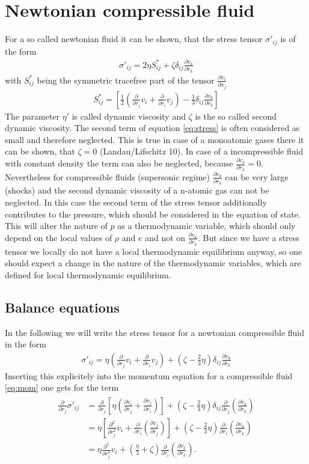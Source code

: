 \documentclass[a4paper,
					12pt,
					twoside,
					openright
					]{book}
\newcommand{\lra}[1]{{ \left( #1 \right) }}
\newcommand{\lrb}[1]{{ \left[ #1 \right] }}
\newcommand{\pd}[1]{\frac{\partial}{\partial #1}}
\newcommand{\ppd}[2]{\frac{\partial #2}{\partial #1}}
\newcommand{\pdd}[1]{\frac{\partial^2}{\partial #1^2}}
\begin{document}
\chapter{Newtonian compressible fluid}
For a so called newtonian fluid it can be shown, that the stress tensor
$\sigma'_{ij}$ is of the form
\begin{align}
\sigma'_{ij}=2\eta S^*_{ij}+\zeta \delta_{ij}\ppd{r_k}{v_k}
\label{eq:stress}
\end{align}
with $S^*_{ij}$ being the symmetric tracefree part of the tensor
$\ppd{x_j}{v_i}$
\begin{align}
S^*_{ij}=\lrb{\frac{1}{2}\lra{\pd{r_j}v_i+\pd{r_i}v_j}-\frac{1}{3}\delta_{ij}
\ppd{r_k}{v_k}}
\end{align}
The parameter $\eta'$ is called dynamic viscosity and $\zeta$ is the so called
second dynamic viscosity. The second term of equation \eqref{eq:stress} is
often considered as small and therefore neglected. This is true in case of a
monoatomic gases there it can be shown, that $\zeta=0$ (Landau/Lifschitz 10).
In case of a incompressible fluid with constant density the term can also be
neglected, because $\ppd{r_k}{v_k} = 0$. Nevertheless for compressible fluids
(supersonic regime) $\ppd{r_k}{v_k}$ can be very large (shocks) and the second
dynamic viscosity of a n-atomic gas can not be neglected. In this case the
second term of the stress tensor additionally contributes to the pressure,
which should be considered in the equation of state. This will alter the nature
of $p$ as a thermodynamic variable, which should only depend on the local values
of $\rho$ and $e$ and not on $\ppd{r_k}{v_k}$. But since we have a stress tensor
we locally do not have a local thermodynamic equilibrium anyway, so one should
expect a change in the nature of the thermodynamic variables, which are
defined for local thermodynamic equilibrium.

\section{Balance equations}
In the following we will write the stress tensor for a newtonian compressible 
fluid in the form
\begin{align}
\sigma'_{ij}= \eta\lra{\pd{r_j}v_i+\pd{r_i}v_j} 
+ \lra{\zeta-\frac{2}{3}\eta}\delta_{ij}\ppd{r_k}{v_k} 
\label{eq:stress2}
\end{align}
Inserting this explicitely into the momentum equation for a compressible fluid
\eqref{eq:mom} one gets for the term
\begin{align}
\begin{split}
\pd{r_j} \sigma'_{ij} &= 
\pd{r_j}\lrb{\eta \lra{\ppd{r_j}{v_i}+\ppd{r_i}{v_j}}}
+\lra{\zeta-\frac{2}{3}\eta}\delta_{ij}\pd{r_j}\lra{\ppd{r_k}{v_k}}\\
&= \eta \lrb{\pdd{r_j}v_i +\pd{r_i}\lra{\ppd{r_j}{v_j}}}
+\lra{\zeta-\frac{2}{3}\eta}\pd{r_i}\lra{\ppd{r_k}{v_k}}\\
&=\eta \pdd{r_j}v_i
+\lra{\frac{\eta}{3}+\zeta}\pd{r_i}\lra{\ppd{r_k}{v_k}}.
\end{split}
\label{eq:divstress}
\end{align}
\end{document}

